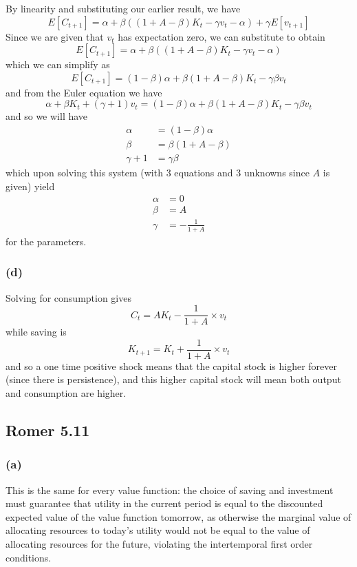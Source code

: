 \documentclass[11pt]{amsart}
\begin{document}
By linearity and substituting our earlier result, we have
\[
E[C_{t+1}] = \alpha + \beta ((1 + A - \beta) K_t - \gamma v_t - \alpha) + \gamma E[v_{t+1}]
\]
Since we are given that $v_t$ has expectation zero, we can substitute to obtain
\[
E[C_{t+1}] = \alpha + \beta ((1 + A - \beta) K_t - \gamma v_t - \alpha)
\]
which we can simplify as
\[
E[C_{t+1}] = (1 - \beta) \alpha + \beta (1 + A - \beta) K_t - \gamma \beta v_t
\]
and from the Euler equation we have
\[
\alpha + \beta K_t + (\gamma + 1) v_t  = (1 - \beta) \alpha + \beta (1 + A - \beta) K_t - \gamma \beta v_t
\]
and so we will have
\begin{align*}
\alpha &= (1 - \beta) \alpha \\
\beta &= \beta (1 + A - \beta) \\
\gamma + 1 &= \gamma \beta
\end{align*}
which upon solving this system (with 3 equations and 3 unknowns since $A$ is given) yield
\begin{align*}
\alpha &= 0 \\
\beta &= A\\
\gamma &= -\frac{1}{1 + A}
\end{align*}
for the parameters.

\subsubsection*{(d)}

Solving for consumption gives
\[
C_t = AK_t - \frac{1}{1 + A} \times v_t
\]
while saving is
\[
K_{t+1} = K_t + \frac{1}{1 + A} \times v_t
\]
and so a one time positive shock means that the capital stock is higher forever (since there is persistence), and this higher capital stock will mean both output and consumption are higher.


\subsection{Romer 5.11}

\subsubsection*{(a)}

This is the same for every value function: the choice of saving and investment must guarantee that utility in the current period is equal to the discounted expected value of the value function tomorrow, as otherwise the marginal value of allocating resources to today's utility would not be equal to the value of allocating resources for the future, violating the intertemporal first order conditions.
\end{document}
